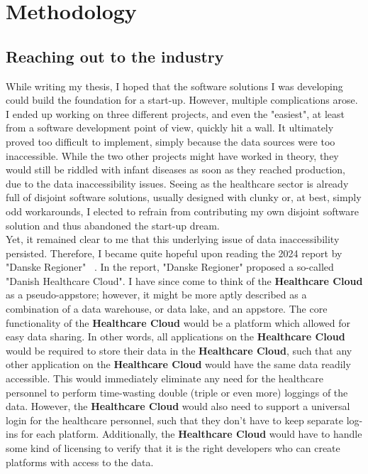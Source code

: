 \section{Methodology}
\subsection{Reaching out to the industry}
While writing my thesis, I hoped that the software solutions I was developing could build the foundation for a start-up. However, multiple complications arose. I ended up working on three different projects, and even the "easiest", at least from a software development point of view, quickly hit a wall. It ultimately proved too difficult to implement, simply because the data sources were too inaccessible. While the two other projects might have worked in theory, they would still be riddled with infant diseases as soon as they reached production, due to the data inaccessibility issues. Seeing as the healthcare sector is already full of disjoint software solutions, usually designed with clunky or, at best, simply odd workarounds, I elected to refrain from contributing my own disjoint software solution and thus abandoned the start-up dream.
\\
Yet, it remained clear to me that this underlying issue of data inaccessibility persisted. Therefore, I became quite hopeful upon reading the 2024 report by "Danske Regioner" ~\cite{Den-Reg-digitalisation}. In the report, "Danske Regioner" proposed a so-called "Danish Healthcare Cloud". I have since come to think of the \textbf{Healthcare Cloud} as a pseudo-appstore; however, it might be more aptly described as a combination of a data warehouse, or data lake, and an appstore. The core functionality of the \textbf{Healthcare Cloud} would be a platform which allowed for easy data sharing. In other words, all applications on the \textbf{Healthcare Cloud} would be required to store their data in the \textbf{Healthcare Cloud}, such that any other application on the \textbf{Healthcare Cloud} would have the same data readily accessible. This would immediately eliminate any need for the healthcare personnel to perform time-wasting double (triple or even more) loggings of the data. However, the \textbf{Healthcare Cloud} would also need to support a universal login for the healthcare personnel, such that they don't have to keep separate log-ins for each platform. Additionally, the \textbf{Healthcare Cloud} would have to handle some kind of licensing to verify that it is the right developers who can create platforms with access to the data.
